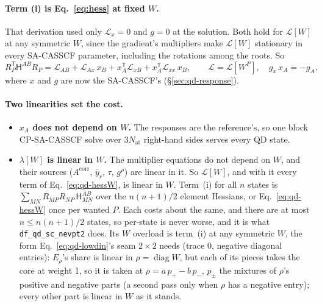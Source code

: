 \documentclass[11pt]{article}
\newcommand{\code}[1]{\texttt{#1}}
\newcommand{\Lag}{\mathcal L}
\newcommand{\T}{\mathsf T}
\begin{document}
\paragraph{Term (i) is Eq.~\eqref{eq:hess} at fixed $W$.} That derivation
used only $\Lag_x = 0$ and $g = 0$ at the solution. Both hold for $\Lag[W]$
at any symmetric $W$, since the gradient's multipliers make $\Lag[W]$
stationary in every SA-CASSCF parameter, including the rotations among the
roots. So
\begin{equation}
  R_P^\T\mathsf H^{AB}R_P = \Lag_{AB} + \Lag_{Ax}\,x_B + x_A^\T\Lag_{xB}
    + x_A^\T\Lag_{xx}\,x_B,\qquad \Lag = \Lag[W^P],\quad g_x\,x_A = -g_A,
  \label{eq:qd-hessW}
\end{equation}
where $x$ and $g$ are now the SA-CASSCF's (\S\ref{sec:qd-response}).

\paragraph{Two linearities set the cost.}
\begin{itemize}
\item \textbf{$x_A$ does not depend on $W$.} The responses are the
  reference's, so one block CP-SA-CASSCF solve over $3N_{\mathrm{at}}$
  right-hand sides serves every QD state.
\item \textbf{$\lambda[W]$ is linear in $W$.} The multiplier equations do
  not depend on $W$, and their sources ($A^{\mathrm{corr}}$, $\bar y_r$,
  $\tau$, $g^\rho$) are linear in it. So $\Lag[W]$, and with it every term
  of Eq.~\eqref{eq:qd-hessW}, is linear in $W$. Term~(i) for all $n$
  states is $\sum_{MN}R_{MP}R_{NP}\,\mathsf H^{AB}_{MN}$ over the
  $n(n+1)/2$ element Hessians, or Eq.~\eqref{eq:qd-hessW} once per
  wanted $P$. Each costs about the same, and there are at most $n \le
  n(n+1)/2$ states, so per-state is never worse, and it is what
  \code{df\_qd\_sc\_nevpt2} does. Its $W$ overload is term~(i) at any
  symmetric $W$, the form Eq.~\eqref{eq:qd-lowdin}'s seam $2\times2$ needs
  (trace 0, negative diagonal entries): $E_\rho$'s share is linear in
  $\rho = \operatorname{diag}W$, but each of its pieces takes the core at
  weight 1, so it is taken at $\rho = a\,p_+ - b\,p_-$, $p_\pm$ the
  mixtures of $\rho$'s positive and negative parts (a second pass only when
  $\rho$ has a negative entry); every other part is linear in $W$ as it
  stands.
\end{itemize}
\end{document}
